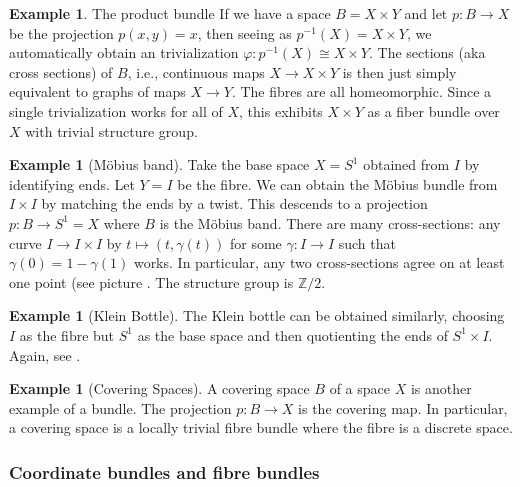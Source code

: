 \documentclass[reqno]{amsart}
\theoremstyle{definition}
\newtheorem{example}[theorem]{Example}
\theoremstyle{remark}
\begin{document}
\begin{example}{The product bundle}
    If we have a space $B = X \times Y$ and let
    $p \colon B \to X$ be the projection
    $p(x,y) = x$, then seeing as
     $p^{-1}(X) = X\times Y$, we automatically obtain
     an trivialization
      $\varphi  \colon p^{-1}(X) \cong X \times Y$.
      The sections (aka cross sections) of 
      $B$, i.e., continuous maps
      $X \to X \times Y$ is then just simply equivalent to
      graphs of maps $X \to Y$. The fibres are
      all homeomorphic.
      Since a single trivialization works for all
      of $X$, this exhibits $X \times Y$ 
      as a fiber bundle over $X$ with trivial structure group.
\end{example}

\begin{example}[Möbius band]
    Take the base space $X = S^{1}$ obtained from
    $I$ by identifying ends. Let $Y = I$ be the fibre.
    We can obtain the Möbius bundle from
    $I \times I$ by matching the ends by a twist. This
    descends to a projection
    $p \colon B \to S^{1} = X$ where $B$ is the Möbius band.
    There are many cross-sections: any curve
    $I \to I \times I$ by $t \mapsto \left( t, 
    \gamma(t) \right) $ for some $\gamma \colon I \to I$ 
    such that $\gamma(0) = 1- \gamma(1)$ works. In particular,
    any two cross-sections agree on at least one point (see
    picture \cite[p. 4]{Steenrod}. The structure group
    is $\mathbb{Z} /2$.
\end{example}

\begin{example}[Klein Bottle]
    The Klein bottle can be obtained similarly, choosing
    $I$ as the fibre but $S^{1}$ as the base space and then
    quotienting the ends of $S^{1} \times I$. Again, see
    \cite[p. 4]{Steenrod}.
\end{example}

\begin{example}[Covering Spaces]
    A covering space $B$ of a space $X$ is another example
    of a bundle. The projection
    $p \colon B \to X$ is the covering map.
    In particular, a covering space is a
    locally trivial fibre bundle where the fibre is a discrete
    space.\\
\end{example}

\subsubsection{Coordinate bundles and fibre bundles}
\end{document}

